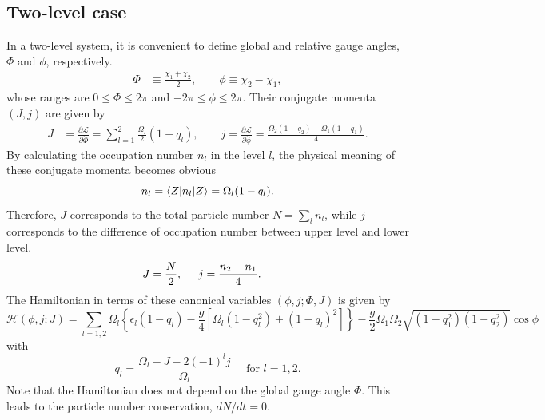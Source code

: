 \documentclass[%
superscriptaddress,
preprint,
showpacs,
nofootinbib,
amsmath,amssymb,
aps,
prc,
floatfix ]%
{revtex4-1}
\begin{document}
\subsection{Two-level case}

In a two-level system,
it is convenient to define global and relative gauge angles,
$\Phi$ and $\phi$, respectively.
\begin{align}
  \Phi &\equiv \frac{\chi_1 + \chi_2}{2}, \quad\quad
\phi\equiv \chi_2 - \chi_1,
\label{phi}
\end{align}
whose ranges are $0\leq \Phi \leq 2\pi$ and $-2\pi \leq \phi \leq 2\pi$.
Their conjugate momenta $(J,j)$ are given by
\begin{align}
	J &= \frac{\partial\mathcal{L}}{\partial\dot{\Phi}} =  \sum_{l=1}^2 \frac{\Omega_l}{2}(1-q_l), 
\quad\quad
j = \frac{\partial\mathcal{L}}{\partial\dot{\phi}} = \frac{\Omega_2(1-q_2) - \Omega_1(1-q_1)}{4}.
	\label{pi}
\end{align}
By calculating the occupation number $n_l$ in the level $l$,
the physical meaning of these conjugate momenta becomes obvious
\begin{equation}
   n_l = \braket{Z|n_l|Z} %
	= \Omega_l(1-q_l) .
\end{equation}
Therefore, $J$ corresponds to the total particle number
$N=\sum_l n_l$,
while $j$ corresponds to the difference of occupation number
between upper level and lower level. 
\begin{align}
  J &= \frac{N}{2}, \hspace{5mm} j = \frac{n_{2}-n_{1}}{4} .
  \label{momentum}
\end{align}
The Hamiltonian in terms of these canonical variables
$(\phi,j;\Phi,J)$ is given by
\begin{equation}
\mathcal{H}(\phi,j;J)
	= \sum_{l=1,2} \Omega_l \left\{ \epsilon_l(1- q_l)
	- \frac{g}{4} [\Omega_l(1-q_l^2)+(1-q_l)^2] \right\}
- \frac{g}{2}\Omega_1\Omega_2
	\sqrt{(1-q_1^2)(1-q_2^2)} \cos\phi
\label{TDHFB_Hamiltonian_3}
\end{equation}
with
\begin{equation}
	q_l=\frac{\Omega_l - J -2(-1)^l j}{\Omega_l} 
	\quad \mbox{ for } l=1,2.
	\label{q_l}
\end{equation}
Note that the Hamiltonian does not depend on the global gauge angle $\Phi$.
This leads to the particle number conservation, $dN/dt=0$.
\end{document}
